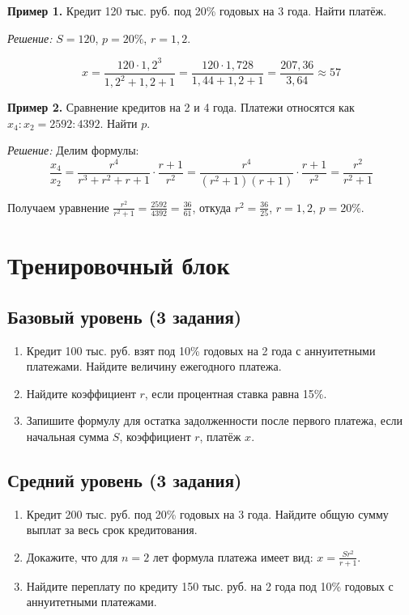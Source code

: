 \documentclass[a4paper,12pt]{article}
\begin{document}
\textbf{Пример 1.} Кредит 120 тыс. руб. под 20\% годовых на 3 года. Найти платёж.

\textit{Решение:} $S = 120$, $p = 20\%$, $r = 1{,}2$. 

$$x = \frac{120 \cdot 1{,}2^3}{1{,}2^2 + 1{,}2 + 1} = \frac{120 \cdot 1{,}728}{1{,}44 + 1{,}2 + 1} = \frac{207{,}36}{3{,}64} \approx 57$$

\textbf{Пример 2.} Сравнение кредитов на 2 и 4 года. Платежи относятся как $x_4 : x_2 = 2592 : 4392$. Найти $p$.

\textit{Решение:} Делим формулы:
$$\frac{x_4}{x_2} = \frac{r^4}{r^3 + r^2 + r + 1} \cdot \frac{r + 1}{r^2} = \frac{r^4}{(r^2+1)(r+1)} \cdot \frac{r+1}{r^2} = \frac{r^2}{r^2+1}$$

Получаем уравнение $\frac{r^2}{r^2+1} = \frac{2592}{4392} = \frac{36}{61}$, откуда $r^2 = \frac{36}{25}$, $r = 1{,}2$, $p = 20\%$.

\newpage

\section*{Тренировочный блок}

\subsection*{Базовый уровень (3 задания)}
\begin{enumerate}[label=\arabic*., leftmargin=*]
    \item Кредит 100 тыс. руб. взят под 10\% годовых на 2 года с аннуитетными платежами. Найдите величину ежегодного платежа.
    
    \item Найдите коэффициент $r$, если процентная ставка равна 15\%.
    
    \item Запишите формулу для остатка задолженности после первого платежа, если начальная сумма $S$, коэффициент $r$, платёж $x$.
\end{enumerate}

\subsection*{Средний уровень (3 задания)}
\begin{enumerate}[label=\arabic*., leftmargin=*, start=4]
    \item Кредит 200 тыс. руб. под 20\% годовых на 3 года. Найдите общую сумму выплат за весь срок кредитования.
    
    \item Докажите, что для $n=2$ лет формула платежа имеет вид: $x = \frac{Sr^2}{r+1}$.
    
    \item Найдите переплату по кредиту 150 тыс. руб. на 2 года под 10\% годовых с аннуитетными платежами.
\end{enumerate}
\end{document}
